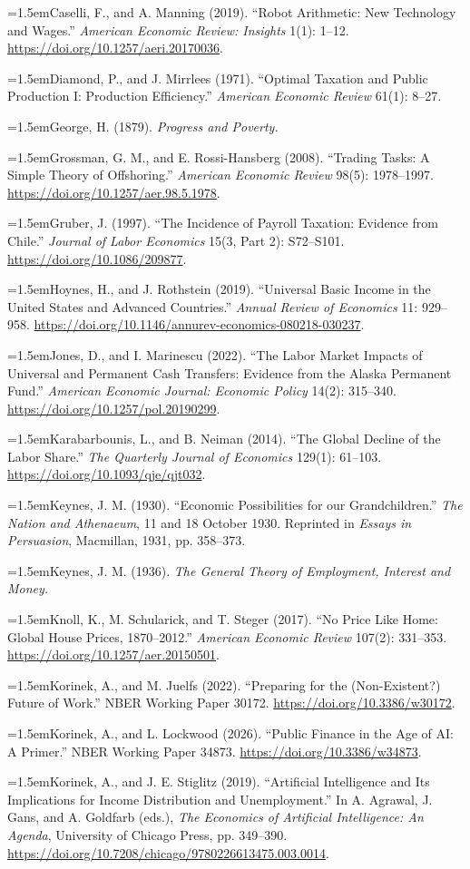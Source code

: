 \documentclass[12pt]{article}
\theoremstyle{plain}
\theoremstyle{definition}
\theoremstyle{remark}
\newcommand{\refentry}[1]{\par\hangindent=1.5em\hangafter=1\noindent #1}
\begin{document}
{\refentry{Caselli, F., and A. Manning (2019). ``Robot Arithmetic: New Technology and Wages.'' \emph{American Economic Review: Insights} 1(1): 1--12. \url{https://doi.org/10.1257/aeri.20170036}.}
\refentry{Diamond, P., and J. Mirrlees (1971). ``Optimal Taxation and Public Production I: Production Efficiency.'' \emph{American Economic Review} 61(1): 8--27.}
\refentry{George, H. (1879). \emph{Progress and Poverty.}}
\refentry{Grossman, G. M., and E. Rossi-Hansberg (2008). ``Trading Tasks: A Simple Theory of Offshoring.'' \emph{American Economic Review} 98(5): 1978--1997. \url{https://doi.org/10.1257/aer.98.5.1978}.}
\refentry{Gruber, J. (1997). ``The Incidence of Payroll Taxation: Evidence from Chile.'' \emph{Journal of Labor Economics} 15(3, Part 2): S72--S101. \url{https://doi.org/10.1086/209877}.}
\refentry{Hoynes, H., and J. Rothstein (2019). ``Universal Basic Income in the United States and Advanced Countries.'' \emph{Annual Review of Economics} 11: 929--958. \url{https://doi.org/10.1146/annurev-economics-080218-030237}.}
\refentry{Jones, D., and I. Marinescu (2022). ``The Labor Market Impacts of Universal and Permanent Cash Transfers: Evidence from the Alaska Permanent Fund.'' \emph{American Economic Journal: Economic Policy} 14(2): 315--340. \url{https://doi.org/10.1257/pol.20190299}.}
\refentry{Karabarbounis, L., and B. Neiman (2014). ``The Global Decline of the Labor Share.'' \emph{The Quarterly Journal of Economics} 129(1): 61--103. \url{https://doi.org/10.1093/qje/qjt032}.}
\refentry{Keynes, J. M. (1930). ``Economic Possibilities for our Grandchildren.'' \emph{The Nation and Athenaeum}, 11 and 18 October 1930. Reprinted in \emph{Essays in Persuasion}, Macmillan, 1931, pp. 358--373.}
\refentry{Keynes, J. M. (1936). \emph{The General Theory of Employment, Interest and Money.}}
\refentry{Knoll, K., M. Schularick, and T. Steger (2017). ``No Price Like Home: Global House Prices, 1870--2012.'' \emph{American Economic Review} 107(2): 331--353. \url{https://doi.org/10.1257/aer.20150501}.}
\refentry{Korinek, A., and M. Juelfs (2022). ``Preparing for the (Non-Existent?) Future of Work.'' NBER Working Paper 30172. \url{https://doi.org/10.3386/w30172}.}
\refentry{Korinek, A., and L. Lockwood (2026). ``Public Finance in the Age of AI: A Primer.'' NBER Working Paper 34873. \url{https://doi.org/10.3386/w34873}.}
\refentry{Korinek, A., and J. E. Stiglitz (2019). ``Artificial Intelligence and Its Implications for Income Distribution and Unemployment.'' In A. Agrawal, J. Gans, and A. Goldfarb (eds.), \emph{The Economics of Artificial Intelligence: An Agenda}, University of Chicago Press, pp. 349--390. \url{https://doi.org/10.7208/chicago/9780226613475.003.0014}.}
}
\end{document}
